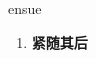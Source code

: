 
\begin{frame}
{\huge ensue}
\begin{center}
\begin{enumerate}\Large
  \item \textbf{紧随其后}
\end{enumerate}
\end{center}
\end{frame}

